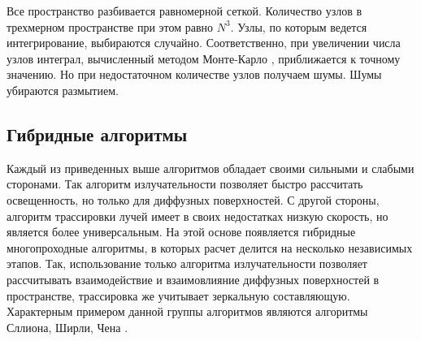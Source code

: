 Все пространство разбивается равномерной сеткой. Количество узлов в трехмерном пространстве при этом равно $N^3$. Узлы, по которым ведется интегрирование, выбираются случайно. Соответственно, при увеличении числа узлов интеграл, вычисленный методом Монте-Карло  \cite{history}, приближается к точному значению. Но при недостаточном количестве узлов получаем шумы. Шумы убираются размытием. 

\subsection*{Гибридные алгоритмы}

Каждый из приведенных выше алгоритмов обладает своими сильными и слабыми сторонами. Так алгоритм излучательности позволяет быстро рассчитать освещенность, но только для диффузных поверхностей. С другой стороны, алгоритм трассировки лучей имеет в своих недостатках низкую скорость, но является более универсальным. На этой основе появляется гибридные многопроходные алгоритмы, в которых расчет делится на несколько независимых этапов. Так, использование только алгоритма излучательности позволяет рассчитывать взаимодействие и взаимовлияние диффузных поверхностей в пространстве, трассировка же учитывает зеркальную составляющую. Характерным примером данной группы алгоритмов являются алгоритмы Сллиона, Ширли, Чена  \cite{history}.

